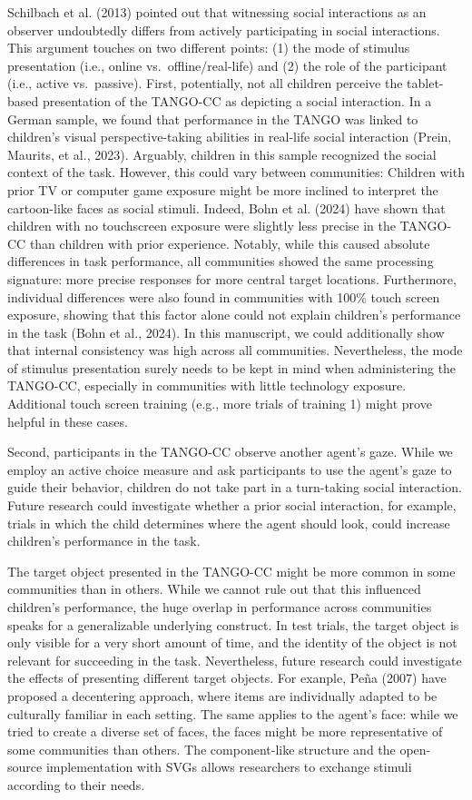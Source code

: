 \documentclass[
  man,mask,floatsintext]{apa7}
\begin{document}
Schilbach et al. (2013) pointed out that witnessing social interactions as an observer undoubtedly differs from actively participating in social interactions. This argument touches on two different points: (1) the mode of stimulus presentation (i.e., online vs.~offline/real-life) and (2) the role of the participant (i.e., active vs.~passive). First, potentially, not all children perceive the tablet-based presentation of the TANGO-CC as depicting a social interaction. In a German sample, we found that performance in the TANGO was linked to children's visual perspective-taking abilities in real-life social interaction (Prein, Maurits, et al., 2023). Arguably, children in this sample recognized the social context of the task. However, this could vary between communities: Children with prior TV or computer game exposure might be more inclined to interpret the cartoon-like faces as social stimuli. Indeed, Bohn et al. (2024) have shown that children with no touchscreen exposure were slightly less precise in the TANGO-CC than children with prior experience. Notably, while this caused absolute differences in task performance, all communities showed the same processing signature: more precise responses for more central target locations. Furthermore, individual differences were also found in communities with 100\% touch screen exposure, showing that this factor alone could not explain children's performance in the task (Bohn et al., 2024). In this manuscript, we could additionally show that internal consistency was high across all communities. Nevertheless, the mode of stimulus presentation surely needs to be kept in mind when administering the TANGO-CC, especially in communities with little technology exposure. Additional touch screen training (e.g., more trials of training 1) might prove helpful in these cases.

Second, participants in the TANGO-CC observe another agent's gaze. While we employ an active choice measure and ask participants to use the agent's gaze to guide their behavior, children do not take part in a turn-taking social interaction. Future research could investigate whether a prior social interaction, for example, trials in which the child determines where the agent should look, could increase children's performance in the task.

The target object presented in the TANGO-CC might be more common in some communities than in others. While we cannot rule out that this influenced children's performance, the huge overlap in performance across communities speaks for a generalizable underlying construct. In test trials, the target object is only visible for a very short amount of time, and the identity of the object is not relevant for succeeding in the task. Nevertheless, future research could investigate the effects of presenting different target objects. For exanple, Peña (2007) have proposed a decentering approach, where items are individually adapted to be culturally familiar in each setting. The same applies to the agent's face: while we tried to create a diverse set of faces, the faces might be more representative of some communities than others. The component-like structure and the open-source implementation with SVGs allows researchers to exchange stimuli according to their needs.
\end{document}
